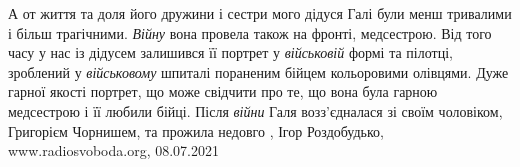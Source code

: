А от життя та доля його дружини і сестри мого дідуся Галі були менш тривалими і
більш трагічними. \emph{Війну} вона провела також на фронті, медсестрою. Від того часу
у нас із дідусем залишився її портрет у \emph{військовій} формі та пілотці, зроблений
у \emph{військовому} шпиталі пораненим бійцем кольоровими олівцями. Дуже гарної якості
портрет, що може свідчити про те, що вона була гарною медсестрою і її любили
бійці. Після \emph{війни} Галя возз’єдналася зі своїм чоловіком, Григорієм Чорнишем,
та прожила недовго
, 
Ігор Роздобудько, www.radiosvoboda.org, 08.07.2021

